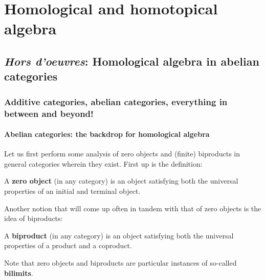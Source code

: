 \chapter{Homological and homotopical algebra}
    \begin{abstract}
        
    \end{abstract}
    
    \minitoc
    
    \section{\textit{Hors d'oeuvres}: Homological algebra in abelian categories}
        \subsection{Additive categories, abelian categories, everything in between and beyond!}
            \subsubsection{Abelian categories: the backdrop for homological algebra}
                Let us first perform some analysis of zero objects and (finite) biproducts in general categories wherein they exist. First up is the definition:
                \begin{definition} \label{def: zero_objects}
                    A \textbf{zero object} (in any category) is an object satisfying both the universal properties of an initial and terminal object.
                \end{definition}
                
                Another notion that will come up often in tandem with that of zero objects is the idea of biproducts:
                \begin{definition}[Biproducts] \label{def: biproducts}
                    A \textbf{biproduct} (in any category) is an object satisfying both the universal properties of a product and a coproduct.
                \end{definition}
                \begin{remark}
                    Note that zero objects and biproducts are particular instances of so-called \textbf{bilimits}. 
                \end{remark}
                
